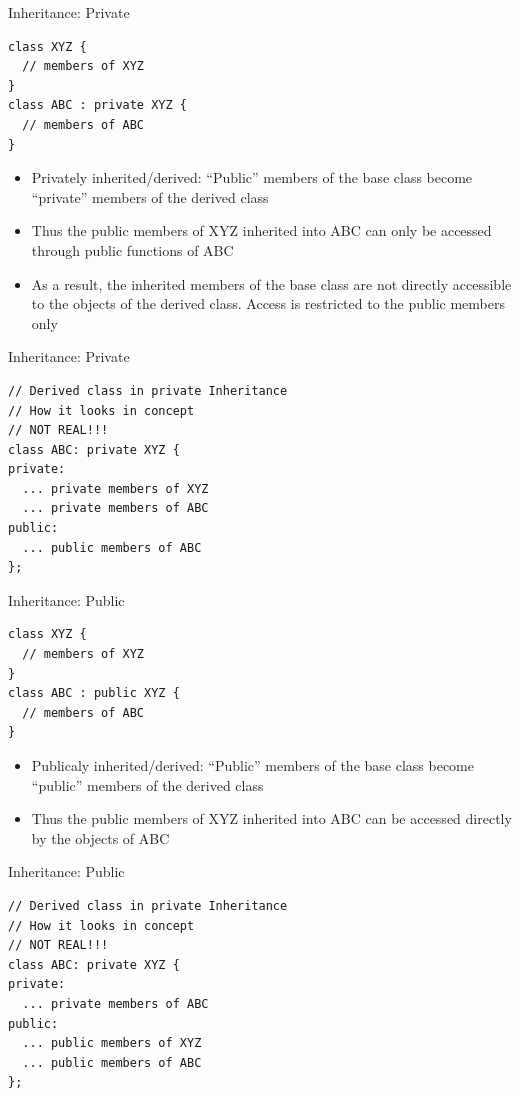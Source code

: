 \documentclass{beamer}
\begin{document}
\begin{frame}[fragile]{Inheritance: Private}
  \begin{lstlisting}
class XYZ {
  // members of XYZ
}
class ABC : private XYZ {
  // members of ABC
}
  \end{lstlisting}\pause
  \begin{itemize}
    \item Privately inherited/derived: ``Public'' members of the base class become ``private'' members of the derived class\pause
    \item Thus the public members of XYZ inherited into ABC can only be accessed through public functions of ABC\pause
    \item As a result, the inherited members of the base class are not directly accessible to the objects of the derived class. Access is restricted to the public members only
  \end{itemize}
\end{frame}

\begin{frame}[fragile]{Inheritance: Private}
  \begin{lstlisting}
// Derived class in private Inheritance
// How it looks in concept
// NOT REAL!!!
class ABC: private XYZ {
private:
  ... private members of XYZ
  ... private members of ABC
public:
  ... public members of ABC
};
  \end{lstlisting}
\end{frame}

\begin{frame}[fragile]{Inheritance: Public}
  \begin{lstlisting}
class XYZ {
  // members of XYZ
}
class ABC : public XYZ {
  // members of ABC
}
  \end{lstlisting}\pause
  \begin{itemize}
    \item Publicaly inherited/derived: ``Public'' members of the base class become ``public'' members of the derived class\pause
    \item Thus the public members of XYZ inherited into ABC can be accessed directly by the objects of ABC
  \end{itemize}
\end{frame}

\begin{frame}[fragile]{Inheritance: Public}
  \begin{lstlisting}
// Derived class in private Inheritance
// How it looks in concept
// NOT REAL!!!
class ABC: private XYZ {
private:
  ... private members of ABC
public:
  ... public members of XYZ
  ... public members of ABC
};
  \end{lstlisting}
\end{frame}
\end{document}
